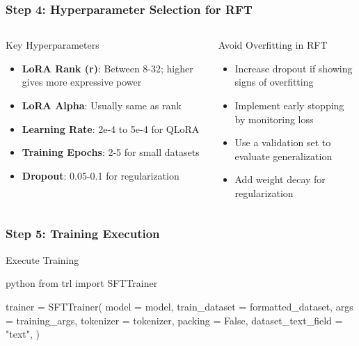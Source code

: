 \documentclass[aspectratio=169]{beamer}
\begin{document}
\begin{frame}[fragile]
	\frametitle{Step 4: Hyperparameter Selection for RFT}
	\begin{columns}
		\begin{column}{0.48\textwidth}
			\begin{block}{Key Hyperparameters}
				\begin{itemize}
					\item \textbf{LoRA Rank (r)}: Between 8-32; higher gives more expressive power
					\item \textbf{LoRA Alpha}: Usually same as rank
					\item \textbf{Learning Rate}: 2e-4 to 5e-4 for QLoRA
					\item \textbf{Training Epochs}: 2-5 for small datasets
					\item \textbf{Dropout}: 0.05-0.1 for regularization
				\end{itemize}
			\end{block}
		\end{column}
		\begin{column}{0.48\textwidth}
			\begin{block}{Avoid Overfitting in RFT}
				\begin{itemize}
					\item Increase dropout if showing signs of overfitting
					\item Implement early stopping by monitoring loss
					\item Use a validation set to evaluate generalization
					\item Add weight decay for regularization
				\end{itemize}
			\end{block}
		\end{column}
	\end{columns}
\end{frame}

\begin{frame}[fragile]
	\frametitle{Step 5: Training Execution}
	\begin{block}{Execute Training}
		\begin{mintedbox}{python}
from trl import SFTTrainer

trainer = SFTTrainer(
    model = model,
    train_dataset = formatted_dataset,
    args = training_args,
    tokenizer = tokenizer,
    packing = False,
    dataset_text_field = "text",
)
		\end{mintedbox}
	\end{block}
\end{frame}
\end{document}
